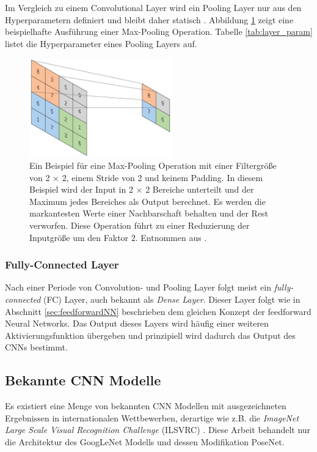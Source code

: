  Im Vergleich zu einem Convolutional Layer wird ein Pooling Layer nur aus den Hyperparametern definiert und bleibt daher statisch \cite{yamashitaConvolutionalNeuralNetworks2018}. Abbildung \ref{fig:pooling_layer} zeigt eine beispielhafte Ausführung einer Max-Pooling Operation. Tabelle \ref{tab:layer_param} listet die Hyperparameter eines Pooling Layers auf.
 \begin{figure}
	\centering
	\includegraphics[width=0.55\textwidth]{images/ann_conv/max_pool.png}
	\caption{Ein Beispiel für eine Max-Pooling Operation mit einer Filtergröße von 2 $\times$ 2, einem Stride von 2 und keinem Padding. In diesem Beispiel wird der Input in 2 $\times$ 2 Bereiche unterteilt und der Maximum jedes Bereiches als Output berechnet. Es werden die markantesten Werte einer Nachbarschaft behalten und der Rest verworfen. Diese Operation führt zu einer Reduzierung der Inputgröße um den Faktor 2. Entnommen aus \cite{yamashitaConvolutionalNeuralNetworks2018}.}
	\label{fig:pooling_layer}
\end{figure}



\subsubsection{Fully-Connected Layer}
Nach einer Periode von Convolution- und Pooling Layer folgt meist ein \textit{fully-connected} (FC) Layer, auch bekannt als \textit{Dense Layer}. Dieser Layer folgt wie in Abschnitt \ref{sec:feedforwardNN} beschrieben dem gleichen Konzept der feedforward Neural Networks. Das Output dieses Layers wird häufig einer weiteren Aktivierungsfunktion übergeben \cite{yamashitaConvolutionalNeuralNetworks2018} und prinzipiell wird dadurch das Output des CNNs bestimmt.

\subsection{Bekannte CNN Modelle}
Es existiert eine Menge von bekannten CNN Modellen mit ausgezeichneten Ergebnissen in internationalen Wettbewerben, derartige wie z.B. die \textit{ImageNet Large Scale Visual Recognition Challenge} (ILSVRC) \cite{russakovskyImageNetLargeScale2015}. Diese Arbeit behandelt nur die Architektur des GoogLeNet Modells und dessen Modifikation PoseNet.

